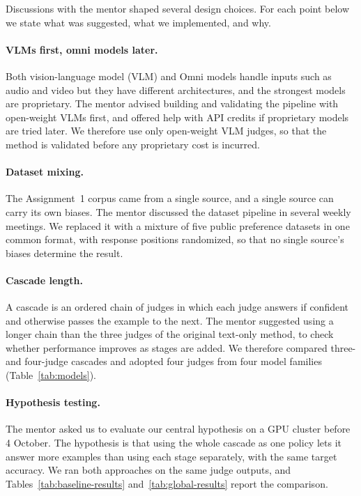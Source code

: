 \documentclass[11pt]{article}
\begin{document}
Discussions with the mentor shaped several design choices. For each point below we state what was suggested, what we implemented, and why.

\paragraph{VLMs first, omni models later.} Both vision-language model (VLM) and Omni models handle inputs such as audio and video but they have different architectures, and the strongest models are proprietary. The mentor advised building and validating the pipeline with open-weight VLMs first, and offered help with API credits if proprietary models are tried later. We therefore use only open-weight VLM judges, so that the method is validated before any proprietary cost is incurred.

\paragraph{Dataset mixing.} The Assignment~1 corpus came from a single source, and a single source can carry its own biases. The mentor discussed the dataset pipeline in several weekly meetings. We replaced it with a mixture of five public preference datasets in one common format, with response positions randomized, so that no single source's biases determine the result.

\paragraph{Cascade length.} A cascade is an ordered chain of judges in which each judge answers if confident and otherwise passes the example to the next. The mentor suggested using a longer chain than the three judges of the original text-only method, to check whether performance improves as stages are added. We therefore compared three- and four-judge cascades and adopted four judges from four model families (Table~\ref{tab:models}).

\paragraph{Hypothesis testing.} The mentor asked us to evaluate our central hypothesis on a GPU cluster before 4 October. The hypothesis is that using the whole cascade as one policy lets it answer more examples than using each stage separately, with the same  target accuracy. We ran both approaches on the same judge outputs, and Tables~\ref{tab:baseline-results} and~\ref{tab:global-results} report the comparison.
\end{document}
